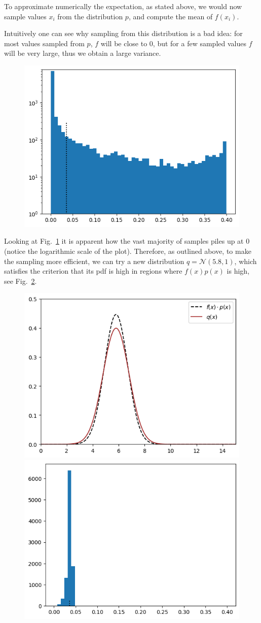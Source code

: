 \documentclass[12pt,a4paper]{article}
\begin{document}
To approximate numerically the expectation, as stated above, we would now sample values $x_i$ from the distribution $p$, and compute the mean of $f(x_i)$.

Intuitively one can see why sampling from this distribution is a bad idea: for most values sampled from $p$, $f$ will be close to 0, but for a few sampled values $f$ will be very large, thus we obtain a large variance.

\begin{figure}[htbp]
\begin{center}
\includegraphics[width=0.5\linewidth]{addons/bad_sampling}
\end{center}
\label{fig:bad_sampling}
\end{figure}

Looking at Fig.~\ref{fig:bad_sampling} it is apparent how the vast majority of samples piles up at 0 (notice the logarithmic scale of the plot). 
Therefore, as outlined above, to make the sampling more efficient, we can try a new distribution $q = \mathcal{N}(5.8, 1)$, which satisfies the criterion that its pdf is high in regions where $f(x)p(x)$ is high, see Fig.~\ref{fig:fp_and_q}.

\begin{figure}[htbp]
\begin{center}
\includegraphics[width=0.4\linewidth]{addons/fp_and_q}
\includegraphics[width=0.4\linewidth]{addons/good_sampling}
\end{center}
\label{fig:fp_and_q}
\end{figure}
\end{document}
